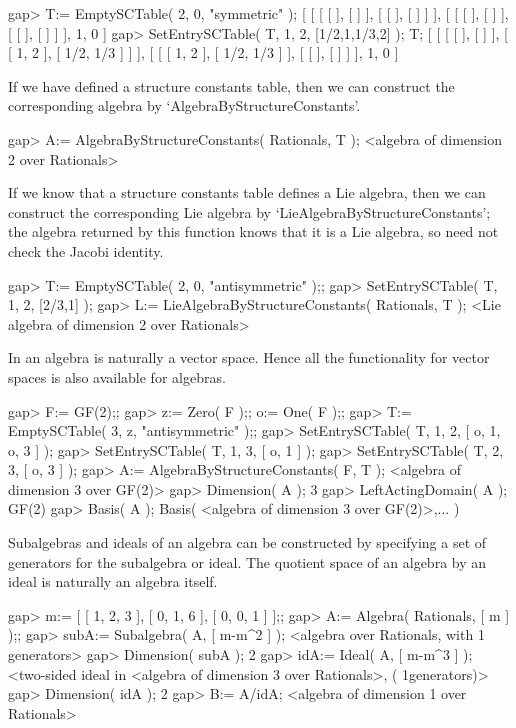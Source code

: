 \beginexample
gap> T:= EmptySCTable( 2, 0, "symmetric" );
[ [ [ [  ], [  ] ], [ [  ], [  ] ] ], [ [ [  ], [  ] ], [ [  ], [  ] ] ], 1, 0 ]
gap> SetEntrySCTable( T, 1, 2, [1/2,1,1/3,2] );  T;
[ [ [ [  ], [  ] ], [ [ 1, 2 ], [ 1/2, 1/3 ] ] ], 
[ [ [ 1, 2 ], [ 1/2, 1/3 ] ], [ [  ], [  ] ] ], 1, 0 ]
\endexample

If we have defined a structure constants table, then we can construct
the corresponding algebra by `AlgebraByStructureConstants'.

\beginexample
gap> A:= AlgebraByStructureConstants( Rationals, T );
<algebra of dimension 2 over Rationals>
\endexample

If we know that a structure constants table defines a Lie algebra,
then we can construct the corresponding Lie algebra by
`LieAlgebraByStructureConstants';
the algebra returned by this function knows that it is a Lie algebra,
so {\GAP} need not check the Jacobi identity.

\beginexample
gap> T:= EmptySCTable( 2, 0, "antisymmetric" );;
gap> SetEntrySCTable( T, 1, 2, [2/3,1] );
gap> L:= LieAlgebraByStructureConstants( Rationals, T );
<Lie algebra of dimension 2 over Rationals>
\endexample

In {\GAP} an algebra is naturally a vector space. Hence all the functionality
for vector spaces is also available for algebras.

\beginexample
gap> F:= GF(2);;
gap> z:= Zero( F );;  o:= One( F );;
gap> T:= EmptySCTable( 3, z, "antisymmetric" );;
gap> SetEntrySCTable( T, 1, 2, [ o, 1, o, 3 ] );
gap> SetEntrySCTable( T, 1, 3, [ o, 1 ] );
gap> SetEntrySCTable( T, 2, 3, [ o, 3 ] );
gap> A:= AlgebraByStructureConstants( F, T );
<algebra of dimension 3 over GF(2)>
gap> Dimension( A );
3
gap> LeftActingDomain( A );
GF(2)
gap> Basis( A );
Basis( <algebra of dimension 3 over GF(2)>,... )
\endexample

Subalgebras and ideals of an algebra can be constructed by specifying
a set of generators for the subalgebra or ideal. The quotient space
of an algebra by an ideal is naturally an algebra itself.

\beginexample
gap> m:= [ [ 1, 2, 3 ], [ 0, 1, 6 ], [ 0, 0, 1 ] ];;
gap> A:= Algebra( Rationals, [ m ] );;
gap> subA:= Subalgebra( A, [ m-m^2 ] );   
<algebra over Rationals, with 1 generators>
gap> Dimension( subA );
2
gap> idA:= Ideal( A, [ m-m^3 ] );
<two-sided ideal in <algebra of dimension 3 over Rationals>, (
1generators)>
gap> Dimension( idA ); 
2
gap> B:= A/idA;
<algebra of dimension 1 over Rationals>
\endexample

